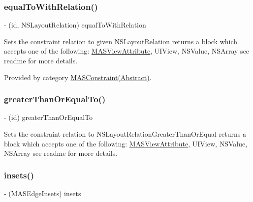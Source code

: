 \subsubsection{\texorpdfstring{equal\+To\+With\+Relation()}{equalToWithRelation()}}
{\footnotesize\ttfamily -\/ (id, N\+S\+Layout\+Relation) equal\+To\+With\+Relation \begin{DoxyParamCaption}{ }\end{DoxyParamCaption}}

Sets the constraint relation to given N\+S\+Layout\+Relation returns a block which accepts one of the following\+: \mbox{\hyperlink{interface_m_a_s_view_attribute}{M\+A\+S\+View\+Attribute}}, U\+I\+View, N\+S\+Value, N\+S\+Array see readme for more details. 

Provided by category \mbox{\hyperlink{category_m_a_s_constraint_07_abstract_08_a06df7a7cb2a7c3e32197800487d8d927}{M\+A\+S\+Constraint(\+Abstract)}}.

\mbox{\label{interface_m_a_s_constraint_ac7b931fa8b821c9603e212d73ab28b91}} 
\subsubsection{\texorpdfstring{greater\+Than\+Or\+Equal\+To()}{greaterThanOrEqualTo()}}
{\footnotesize\ttfamily -\/ (id) greater\+Than\+Or\+Equal\+To \begin{DoxyParamCaption}{ }\end{DoxyParamCaption}}

Sets the constraint relation to N\+S\+Layout\+Relation\+Greater\+Than\+Or\+Equal returns a block which accepts one of the following\+: \mbox{\hyperlink{interface_m_a_s_view_attribute}{M\+A\+S\+View\+Attribute}}, U\+I\+View, N\+S\+Value, N\+S\+Array see readme for more details. \mbox{\label{interface_m_a_s_constraint_a71f2a3447f5666b0c1111e9cc91ec134}} 
\subsubsection{\texorpdfstring{insets()}{insets()}}
{\footnotesize\ttfamily -\/ (M\+A\+S\+Edge\+Insets) insets \begin{DoxyParamCaption}{ }\end{DoxyParamCaption}}

